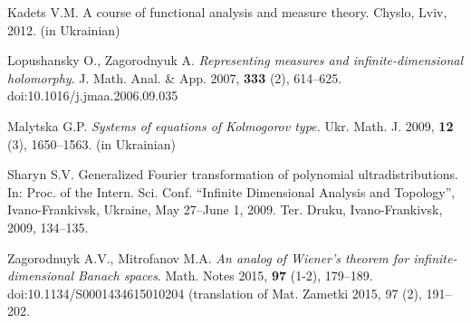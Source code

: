 \documentclass[12pt,twoside,draft]{cmpart}
\begin{document}
\begin{thebibliography}{999}
 Kadets V.M. A course of functional analysis and measure theory.
Chyslo, Lviv, 2012. (in Ukrainian)

 Lopushansky O., Zagorodnyuk A. \emph{Representing measures
and infinite-dimensional holomorphy}. J. Math. Anal. \& App. 2007, \textbf{333} (2), 614--625.
doi:10.1016/j.jmaa.2006.09.035

 Malytska G.P. \emph{Systems of equations of Kolmogorov type.}
Ukr. Math. J. 2009, \textbf{12} (3), 1650--1563. (in Ukrainian)

 Sharyn S.V. Generalized Fourier transformation of
polynomial ultradistributions. In: Proc. of the Intern. Sci. Conf. ``Infinite
Dimensional Analysis and Topology'', Ivano-Frankivsk, Ukraine,
May 27--June 1, 2009. Ter. Druku, Ivano-Frankivsk, 2009, 134--135.

 Zagorodnuyk A.V., Mitrofanov M.A. \emph {An analog of Wiener’s theorem for
infinite-dimensional Banach spaces}. Math. Notes 2015, \textbf{97} (1-2), 179--189.
doi:10.1134/S0001434615010204 (translation of Mat. Zametki 2015, 97 (2), 191--202.

\end{thebibliography}
\end{document}
